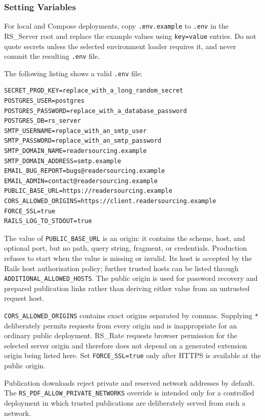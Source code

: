 \documentclass[a4paper, english]{article}
\newcommand{\rsserver}{RS\_Server\xspace}
\newcommand{\rsrate}{RS\_Rate\xspace}
\begin{document}
\subsubsection{Setting Variables}

\label{set-var}

For local and Compose deployments, copy \verb|.env.example| to \verb|.env| in the \rsserver root and replace the example values using \verb|key=value| entries. Do not quote secrets unless the selected environment loader requires it, and never commit the resulting \verb|.env| file.

The following listing shows a valid \verb|.env| file:

\begin{lstlisting}
SECRET_PROD_KEY=replace_with_a_long_random_secret
POSTGRES_USER=postgres
POSTGRES_PASSWORD=replace_with_a_database_password
POSTGRES_DB=rs_server
SMTP_USERNAME=replace_with_an_smtp_user
SMTP_PASSWORD=replace_with_an_smtp_password
SMTP_DOMAIN_NAME=readersourcing.example
SMTP_DOMAIN_ADDRESS=smtp.example
EMAIL_BUG_REPORT=bugs@readersourcing.example
EMAIL_ADMIN=contact@readersourcing.example
PUBLIC_BASE_URL=https://readersourcing.example
CORS_ALLOWED_ORIGINS=https://client.readersourcing.example
FORCE_SSL=true
RAILS_LOG_TO_STDOUT=true
\end{lstlisting}

The value of \verb|PUBLIC_BASE_URL| is an origin: it contains the scheme, host, and optional port, but no path, query string, fragment, or credentials. Production refuses to start when the value is missing or invalid. Its host is accepted by the Rails host authorization policy; further trusted hosts can be listed through \verb|ADDITIONAL_ALLOWED_HOSTS|. The public origin is used for password recovery and prepared publication links rather than deriving either value from an untrusted request host.

\verb|CORS_ALLOWED_ORIGINS| contains exact origins separated by commas. Supplying \verb|*| deliberately permits requests from every origin and is inappropriate for an ordinary public deployment. \rsrate requests browser permission for the selected server origin and therefore does not depend on a generated extension origin being listed here. Set \verb|FORCE_SSL=true| only after HTTPS is available at the public origin.

Publication downloads reject private and reserved network addresses by default. The \verb|RS_PDF_ALLOW_PRIVATE_NETWORKS| override is intended only for a controlled deployment in which trusted publications are deliberately served from such a network.
\end{document}
